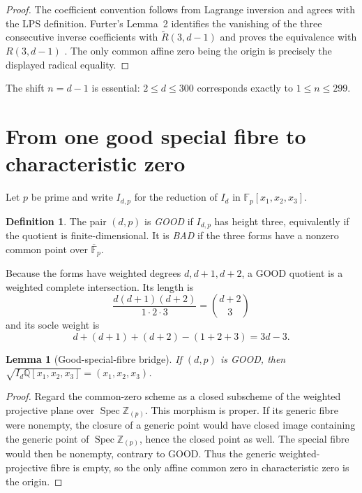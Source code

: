 \documentclass[11pt]{article}
\newtheorem{lemma}[theorem]{Lemma}
\theoremstyle{definition}
\newtheorem{definition}[theorem]{Definition}
\newcommand{\QQ}{\mathbb{Q}}
\newcommand{\ZZ}{\mathbb{Z}}
\newcommand{\FF}{\mathbb{F}}
\begin{document}
\begin{proof}
The coefficient convention follows from Lagrange inversion and agrees with
the LPS definition.  Furter's Lemma~2 identifies the vanishing of the three
consecutive inverse coefficients with $\widetilde R(3,d-1)$ and proves the
equivalence with $R(3,d-1)$ \cite{Furter2015,LPS2019}.  The only common
affine zero being the origin is precisely the displayed radical equality.
\end{proof}

The shift $n=d-1$ is essential: $2\le d\le300$ corresponds exactly to
$1\le n\le299$.

\section{From one good special fibre to characteristic zero}

Let $p$ be prime and write $I_{d,p}$ for the reduction of $I_d$ in
$\FF_p[x_1,x_2,x_3]$.

\begin{definition}
The pair $(d,p)$ is \emph{GOOD} if $I_{d,p}$ has height three, equivalently
if the quotient is finite-dimensional.  It is \emph{BAD} if the three forms
have a nonzero common point over $\overline{\FF}_p$.
\end{definition}

Because the forms have weighted degrees $d,d+1,d+2$, a GOOD quotient is a
weighted complete intersection.  Its length is
\begin{equation}\label{eq:length}
 \frac{d(d+1)(d+2)}{1\cdot2\cdot3}=\binom{d+2}{3}
\end{equation}
and its socle weight is
\begin{equation}\label{eq:socle}
 d+(d+1)+(d+2)-(1+2+3)=3d-3.
\end{equation}

\begin{lemma}[Good-special-fibre bridge]\label{lem:properness}
If $(d,p)$ is GOOD, then
$\sqrt{I_d\QQ[x_1,x_2,x_3]}=(x_1,x_2,x_3)$.
\end{lemma}

\begin{proof}
Regard the common-zero scheme as a closed subscheme of the weighted projective
plane over $\operatorname{Spec}\ZZ_{(p)}$.  This morphism is proper.  If its
generic fibre were nonempty, the closure of a generic point would have closed
image containing the generic point of $\operatorname{Spec}\ZZ_{(p)}$, hence
the closed point as well.  The special fibre would then be nonempty, contrary
to GOOD.  Thus the generic weighted-projective fibre is empty, so the only
affine common zero in characteristic zero is the origin.
\end{proof}
\end{document}

